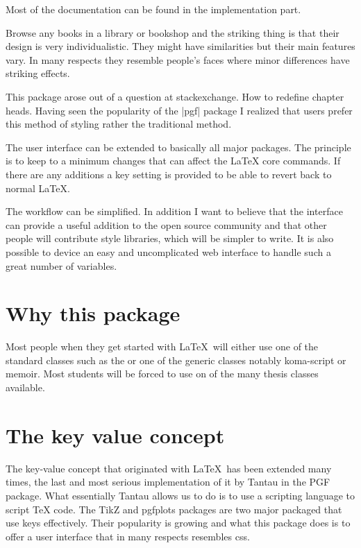  Most of the documentation can be found in the implementation part.

Browse any books in a library or bookshop and the striking thing is that their design is very individualistic. They might have similarities but their main features vary. In many respects they resemble people's faces where minor differences have striking effects.

This package arose out of a question at stackexchange. How to redefine chapter heads. Having seen the popularity of the |pgf| package \cite{pkg-pgf} I realized that \latex users prefer this method of styling rather the traditional \latex method.

The user interface can be extended to basically all major packages. The principle is to keep to a minimum changes that can affect the LaTeX core commands. If there are any additions a key setting is provided to be able to revert back to normal LaTeX.

The workflow can be simplified. In addition I want to believe that the interface can provide a useful addition to the open source community and that other people will contribute style libraries, which will be simpler to write. It is also possible
to device an easy and uncomplicated web interface to handle
such a great number of variables.

\section{Why this package}

Most people when they get started with \LaTeX\ will either use one of the standard classes such as the  or one of the generic classes notably koma-script or memoir. Most students will be forced to use on of the many thesis classes available.

\section{The key value concept}

The key-value concept that originated with \LaTeX\ has been extended many times, the last and most serious implementation of it by Tantau in the PGF package. What essentially Tantau allows us to do is to use a scripting language to script TeX code. The TikZ and pgfplots packages are two major packaged that use keys effectively. Their popularity is growing and what this package does is to offer a user interface that in many respects resembles css.

